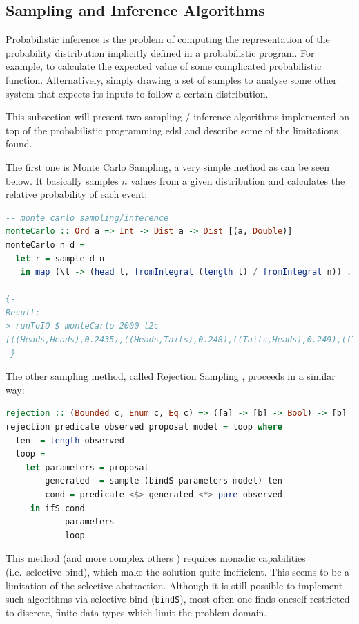 \documentclass[
  oneside,
  11pt, a4paper,
  footinclude=true,
  headinclude=true,
  cleardoublepage=empty
]{scrbook}
\theoremstyle{definition}
\theoremstyle{definition}
\begin{document}
    \subsection{Sampling and Inference Algorithms}
    
    Probabilistic inference is the problem of computing the representation of the probability distribution implicitly defined in a probabilistic program. For example, to calculate the expected value of some complicated probabilistic function. Alternatively, simply drawing a set of samples to analyse some other system that expects its inputs to follow a certain distribution.
    
    This subsection will present two sampling / inference algorithms implemented on top of the probabilistic programming \gls{edsl} and describe some of the limitations found.
    
    The first one is Monte Carlo Sampling, a very simple method as can be seen below. It basically samples $n$ values from a given distribution and calculates the relative probability of each event:
    
    \begin{lstlisting}[language=Haskell, caption={Partial monadic bind function},captionpos=b]
-- monte carlo sampling/inference
monteCarlo :: Ord a => Int -> Dist a -> Dist [(a, Double)]
monteCarlo n d =
  let r = sample d n
   in map (\l -> (head l, fromIntegral (length l) / fromIntegral n)) . group . sort <$> r

{-
Result:
> runToIO $ monteCarlo 2000 t2c
[((Heads,Heads),0.2435),((Heads,Tails),0.248),((Tails,Heads),0.249),((Tails,Tails),0.2595)]
-}
    \end{lstlisting}
    
    
    The other sampling method, called Rejection Sampling \citep{jtobin}, proceeds in a similar way:
    
    \begin{lstlisting}[language=Haskell, caption={Partial monadic bind function},captionpos=b]
rejection :: (Bounded c, Enum c, Eq c) => ([a] -> [b] -> Bool) -> [b] -> Dist c -> (c -> Dist a) -> Dist c
rejection predicate observed proposal model = loop where
  len  = length observed
  loop =
    let parameters = proposal
        generated  = sample (bindS parameters model) len
        cond = predicate <$> generated <*> pure observed
     in ifS cond
            parameters
            loop
    \end{lstlisting}
    
    This method (and more complex others \citep{jtobin}) requires monadic capabilities (i.e.\ selective bind), which make the solution quite inefficient. This seems to be a limitation of the selective abstraction. Although it is still possible to implement such algorithms via selective bind (\texttt{bindS}), most often one finds oneself restricted to discrete, finite data types which limit the problem domain.
    
\end{document}
